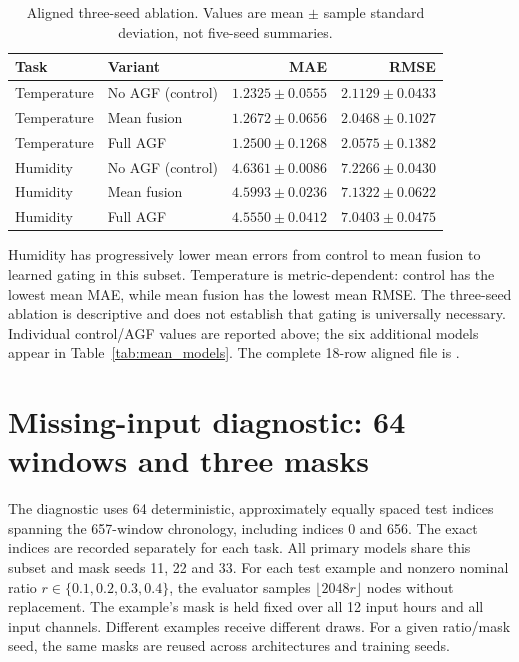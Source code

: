 \documentclass[10pt,a4paper]{article}
\begin{document}
\begin{table}[H]\centering\small\setlength{\tabcolsep}{5pt}\setlength{\parskip}{0pt}

\caption{Aligned three-seed ablation. Values are mean $\pm$ sample standard deviation, not five-seed summaries.}\label{tab:ablation}

\begin{tabular}{llrr}

\toprule
Task & Variant & MAE & RMSE \\
\midrule

Temperature & No AGF (control) & $1.2325 \pm 0.0555$ & $2.1129 \pm 0.0433$ \\

Temperature & Mean fusion & $1.2672 \pm 0.0656$ & $2.0468 \pm 0.1027$ \\

Temperature & Full AGF & $1.2500 \pm 0.1268$ & $2.0575 \pm 0.1382$ \\

Humidity & No AGF (control) & $4.6361 \pm 0.0086$ & $7.2266 \pm 0.0430$ \\

Humidity & Mean fusion & $4.5993 \pm 0.0236$ & $7.1322 \pm 0.0622$ \\

Humidity & Full AGF & $4.5550 \pm 0.0412$ & $7.0403 \pm 0.0475$ \\

\bottomrule\end{tabular}\end{table}

Humidity has progressively lower mean errors from control to mean fusion to learned gating in this subset. Temperature is metric-dependent: control has the lowest mean MAE, while mean fusion has the lowest mean RMSE. The three-seed ablation is descriptive and does not establish that gating is universally necessary. Individual control/AGF values are reported above; the six additional models appear in Table~\ref{tab:mean_models}. The complete 18-row aligned file is .

\section{Missing-input diagnostic: 64 windows and three masks}
The diagnostic uses 64 deterministic, approximately equally spaced test indices spanning the 657-window chronology, including indices 0 and 656. The exact indices are recorded separately for each task. All primary models share this subset and mask seeds 11, 22 and 33. For each test example and nonzero nominal ratio $r\in\{0.1,0.2,0.3,0.4\}$, the evaluator samples $\lfloor2048r\rfloor$ nodes without replacement. The example's mask is held fixed over all 12 input hours and all input channels. Different examples receive different draws. For a given ratio/mask seed, the same masks are reused across architectures and training seeds.
\end{document}
